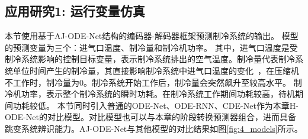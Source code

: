 \subsection{应用研究1: 运行变量仿真}
\label{sec:case-study1}
本节使用基于AJ-ODE-Net结构的编码器-解码器框架预测制冷系统的输出。
模型的预测变量为三个：进气口温度、制冷量和制冷机功率。
其中，进气口温度是受制冷系统影响的控制目标变量，表示制冷系统排出的空气温度。制冷量代表制冷系统单位时间产生的制冷量，其直接影响制冷系统中进气口温度的变化~\cite{alonso2020estimating}，在压缩机不工作时，制冷量为0。制冷系统开始工作后，制冷量会突然飙升至较高水平。
制冷机功率，表示整个制冷系统的瞬时功耗。在制冷系统工作期间功耗较高，待机期间功耗较低。
本节同时引入普通的ODE-Net、ODE-RNN\cite{10.5555/3454287.3454765}、CDE-Net\cite{kidger2020neural}作为本章H-ODE-Net的对比模型。对比模型也可以与本章的阶段转换预测器组合，进而具备跳变系统辨识能力。AJ-ODE-Net与其他模型的对比结果如图\ref{fig:4_models}所示。
